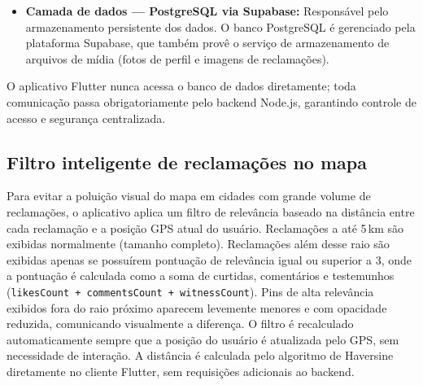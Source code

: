 \begin{itemize}
  \item \textbf{Camada de dados — PostgreSQL via Supabase:} Responsável pelo
        armazenamento persistente dos dados. O banco PostgreSQL é gerenciado
        pela plataforma Supabase, que também provê o serviço de armazenamento
        de arquivos de mídia (fotos de perfil e imagens de reclamações).
\end{itemize}

O aplicativo Flutter nunca acessa o banco de dados diretamente; toda
comunicação passa obrigatoriamente pelo backend Node.js, garantindo
controle de acesso e segurança centralizada.

\subsection*{Filtro inteligente de reclamações no mapa}

Para evitar a poluição visual do mapa em cidades com grande volume de
reclamações, o aplicativo aplica um filtro de relevância baseado na
distância entre cada reclamação e a posição GPS atual do usuário.
Reclamações a até 5\,km são exibidas normalmente (tamanho completo).
Reclamações além desse raio são exibidas apenas se possuírem
pontuação de relevância igual ou superior a 3, onde a pontuação é
calculada como a soma de curtidas, comentários e testemunhos
(\texttt{likesCount + commentsCount + witnessCount}).
Pins de alta relevância exibidos fora do raio próximo aparecem
levemente menores e com opacidade reduzida, comunicando visualmente
a diferença. O filtro é recalculado automaticamente sempre que a
posição do usuário é atualizada pelo GPS, sem necessidade de
interação. A distância é calculada pelo algoritmo de Haversine
diretamente no cliente Flutter, sem requisições adicionais ao backend.
